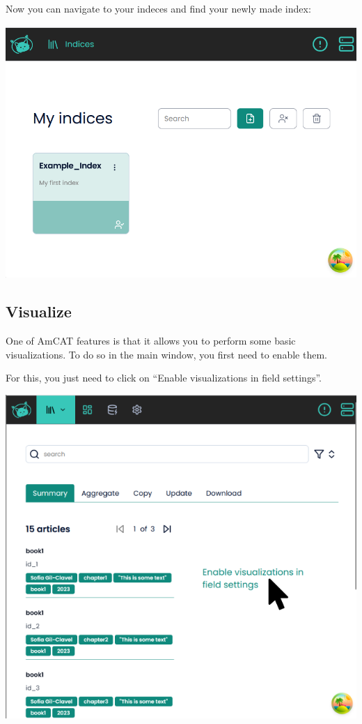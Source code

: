 \documentclass[
  letterpaper,
  DIV=11,
  numbers=noendperiod]{scrreprt}
\begin{document}
Now you can navigate to your indeces and find your newly made index:

\includegraphics{media/amcat-3.1-11.png}

\subsection{Visualize}\label{visualize}

One of AmCAT features is that it allows you to perform some basic
visualizations. To do so in the main window, you first need to enable
them.

For this, you just need to click on ``Enable visualizations in field
settings''.

\includegraphics{media/amcat-3.2-1.png}
\end{document}

